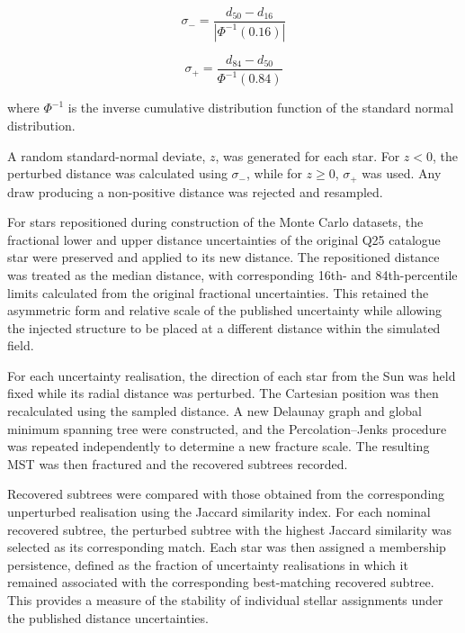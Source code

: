 \documentclass[fleqn,usenatbib]{mnras}
\begin{document}
\begin{equation}
\sigma_{-} =
\frac{d_{50} - d_{16}}
{\left|\Phi^{-1}(0.16)\right|}
\label{eq:sigma_lower}
\end{equation}

\begin{equation}
\sigma_{+} =
\frac{d_{84} - d_{50}}
{\Phi^{-1}(0.84)}
\label{eq:sigma_upper}
\end{equation}

where $\Phi^{-1}$ is the inverse cumulative distribution function of the
standard normal distribution.

A random standard-normal deviate, $z$, was generated for each star. For
$z < 0$, the perturbed distance was calculated using $\sigma_{-}$, while for
$z \geq 0$, $\sigma_{+}$ was used. Any draw producing a non-positive distance
was rejected and resampled.

For stars repositioned during construction of the Monte Carlo datasets, the
fractional lower and upper distance uncertainties of the original Q25
catalogue star were preserved and applied to its new distance. The
repositioned distance was treated as the median distance, with corresponding
16th- and 84th-percentile limits calculated from the original fractional
uncertainties. This retained the asymmetric form and relative scale of the
published uncertainty while allowing the injected structure to be placed at
a different distance within the simulated field.

For each uncertainty realisation, the direction of each star from the Sun was
held fixed while its radial distance was perturbed. The Cartesian position
was then recalculated using the sampled distance. A new Delaunay graph and
global minimum spanning tree were constructed, and the Percolation--Jenks
procedure was repeated independently to determine a new fracture scale. The
resulting MST was then fractured and the recovered subtrees recorded.

Recovered subtrees were compared with those obtained from the corresponding
unperturbed realisation using the Jaccard similarity index. For each nominal
recovered subtree, the perturbed subtree with the highest Jaccard similarity
was selected as its corresponding match. Each star was then assigned a
membership persistence, defined as the fraction of uncertainty realisations
in which it remained associated with the corresponding best-matching
recovered subtree. This provides a measure of the stability of individual
stellar assignments under the published distance uncertainties.
\end{document}
